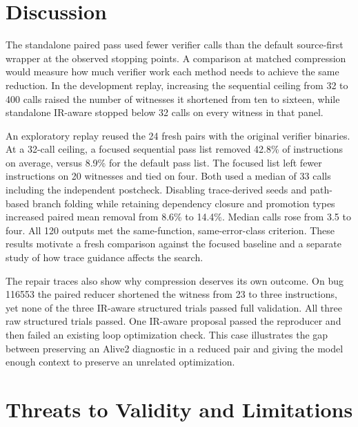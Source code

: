 \documentclass[conference]{IEEEtran}
\begin{document}
\section{Discussion}

The standalone paired pass used fewer verifier calls than the default source-first wrapper at the observed stopping points. A comparison at matched compression would measure how much verifier work each method needs to achieve the same reduction. In the development replay, increasing the sequential ceiling from 32 to 400 calls raised the number of witnesses it shortened from ten to sixteen, while standalone IR-aware stopped below 32 calls on every witness in that panel.

An exploratory replay reused the 24 fresh pairs with the original verifier binaries. At a 32-call ceiling, a focused sequential pass list removed 42.8\% of instructions on average, versus 8.9\% for the default pass list. The focused list left fewer instructions on 20 witnesses and tied on four. Both used a median of 33 calls including the independent postcheck. Disabling trace-derived seeds and path-based branch folding while retaining dependency closure and promotion types increased paired mean removal from 8.6\% to 14.4\%. Median calls rose from 3.5 to four. All 120 outputs met the same-function, same-error-class criterion. These results motivate a fresh comparison against the focused baseline and a separate study of how trace guidance affects the search.

The repair traces also show why compression deserves its own outcome. On bug 116553 the paired reducer shortened the witness from 23 to three instructions, yet none of the three IR-aware structured trials passed full validation. All three raw structured trials passed. One IR-aware proposal passed the reproducer and then failed an existing loop optimization check. This case illustrates the gap between preserving an Alive2 diagnostic in a reduced pair and giving the model enough context to preserve an unrelated optimization.

\section{Threats to Validity and Limitations}
\label{sec:threats}
\end{document}
